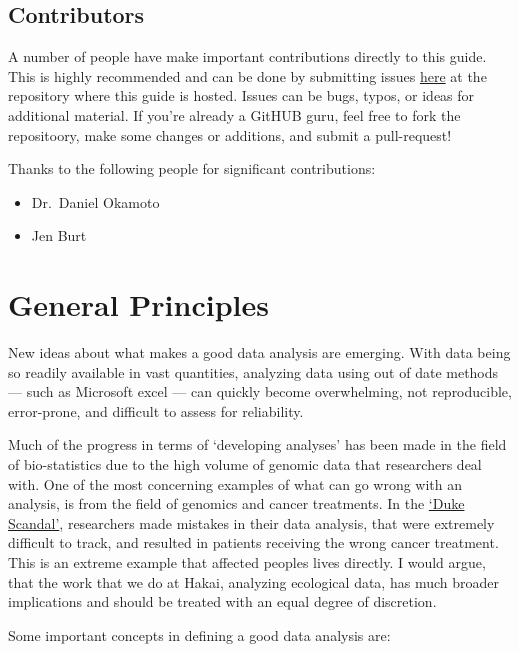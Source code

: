 \documentclass[]{book}
\providecommand{\tightlist}{%
  \setlength{\itemsep}{0pt}\setlength{\parskip}{0pt}}
\begin{document}
\section{Contributors}\label{contributors}

A number of people have make important contributions directly to this
guide. This is highly recommended and can be done by submitting issues
\href{https://github.com/HakaiInstitute/hakai_guide_to_r/issues}{here}
at the repository where this guide is hosted. Issues can be bugs, typos,
or ideas for additional material. If you're already a GitHUB guru, feel
free to fork the repositoory, make some changes or additions, and submit
a pull-request!

Thanks to the following people for significant contributions:

\begin{itemize}
\tightlist
\item
  Dr.~Daniel Okamoto
\item
  Jen Burt
\end{itemize}

\chapter{General Principles}\label{general-principles}

New ideas about what makes a good data analysis are emerging. With data
being so readily available in vast quantities, analyzing data using out
of date methods --- such as Microsoft excel --- can quickly become
overwhelming, not reproducible, error-prone, and difficult to assess for
reliability.

Much of the progress in terms of `developing analyses' has been made in
the field of bio-statistics due to the high volume of genomic data that
researchers deal with. One of the most concerning examples of what can
go wrong with an analysis, is from the field of genomics and cancer
treatments. In the
\href{http://www.cbsnews.com/news/deception-at-duke-fraud-in-cancer-care/}{`Duke
Scandal'}, researchers made mistakes in their data analysis, that were
extremely difficult to track, and resulted in patients receiving the
wrong cancer treatment. This is an extreme example that affected peoples
lives directly. I would argue, that the work that we do at Hakai,
analyzing ecological data, has much broader implications and should be
treated with an equal degree of discretion.

Some important concepts in defining a good data analysis are:
\end{document}
